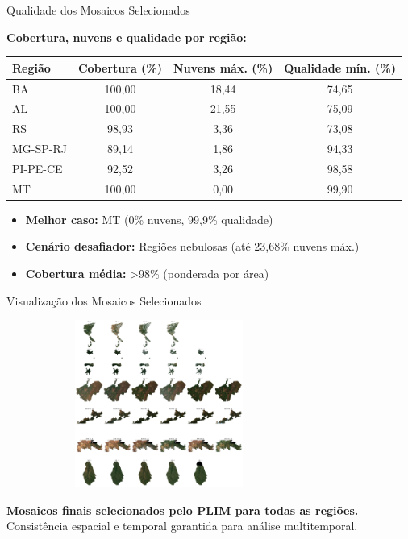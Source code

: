 \documentclass[aspectratio=169,11pt]{beamer}
\begin{document}
\begin{frame}{Qualidade dos Mosaicos Selecionados}
\vspace{-0.2cm}
\begin{center}
\textbf{Cobertura, nuvens e qualidade por região:}
\end{center}

\begin{center}
\footnotesize
\begin{tabular}{lccc}
\toprule
\textbf{Região} & \textbf{Cobertura (\%)} & \textbf{Nuvens máx\@. (\%)} & \textbf{Qualidade mín\@. (\%)} \\
\midrule
BA      & 100,00 & 18,44 & 74,65 \\
AL      & 100,00 & 21,55 & 75,09 \\
RS      & 98,93  & 3,36  & 73,08 \\
MG-SP-RJ& 89,14  & 1,86  & 94,33 \\
PI-PE-CE& 92,52  & 3,26  & 98,58 \\
MT      & 100,00 & 0,00  & 99,90 \\
\bottomrule
\end{tabular}
\end{center}

\vspace{0.3cm}
\begin{itemize}
    \item \textbf{Melhor caso:} MT (0\% nuvens, 99,9\% qualidade)
    \item \textbf{Cenário desafiador:} Regiões nebulosas (até 23,68\% nuvens máx\@.)
    \item \textbf{Cobertura média:} >98\% (ponderada por área)
\end{itemize}
\end{frame}

\begin{frame}{Visualização dos Mosaicos Selecionados}
\begin{center}
    \includegraphics[width=0.75\textwidth,height=5.5cm,keepaspectratio]{img/all_selection.jpg}
\end{center}
\vspace{-0.2cm}
\begin{center}
    \footnotesize\textbf{Mosaicos finais selecionados pelo PLIM para todas as regiões.}\\
    \footnotesize Consistência espacial e temporal garantida para análise multitemporal\@.
\end{center}
\end{frame}
\end{document}
